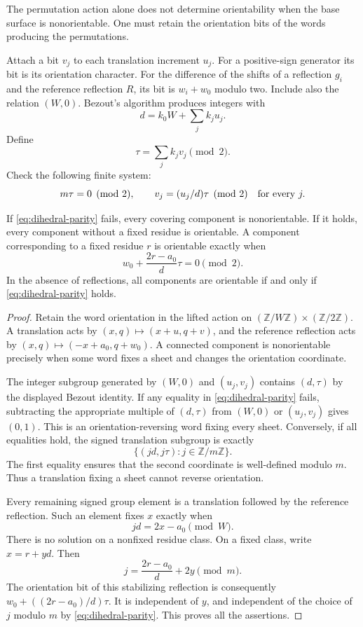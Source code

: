 The permutation action alone does not determine orientability when the
base surface is nonorientable.  One must retain the orientation bits of
the words producing the permutations.

Attach a bit $v_j$ to each translation increment $u_j$.  For a
positive-sign generator its bit is its orientation character.  For the
difference of the shifts of a reflection $g_i$ and the reference
reflection $R$, its bit is $w_i+w_0$ modulo two.  Include also the
relation $(W,0)$.  Bezout's algorithm produces integers with
\[
 d=k_0W+\sum_j k_ju_j.
\]
Define
\[
 \tau=\sum_j k_jv_j\pmod2.
\]
Check the following finite system:
\begin{equation}
 m\tau=0\pmod2,
 \qquad
 v_j=(u_j/d)\tau\pmod2\quad\hbox{for every }j.
 \label{eq:dihedral-parity}
\end{equation}

\begin{lemma}
\label{lem:dihedral-orientation}
If \eqref{eq:dihedral-parity} fails, every covering component is
nonorientable.  If it holds, every component without a fixed residue is
orientable.  A component corresponding to a fixed residue $r$ is
orientable exactly when
\begin{equation}
 w_0+\frac{2r-a_0}{d}\tau=0\pmod2.
 \label{eq:dihedral-exception-orientation}
\end{equation}
In the absence of reflections, all components are orientable if and
only if \eqref{eq:dihedral-parity} holds.
\end{lemma}

\begin{proof}
Retain the word orientation in the lifted action on
$(\mathbb Z/W\mathbb Z)\times(\mathbb Z/2\mathbb Z)$.  A translation
acts by $(x,q)\mapsto(x+u,q+v)$, and the reference reflection acts by
$(x,q)\mapsto(-x+a_0,q+w_0)$.  A connected component is nonorientable
precisely when some word fixes a sheet and changes the orientation
coordinate.

The integer subgroup generated by $(W,0)$ and $(u_j,v_j)$ contains
$(d,\tau)$ by the displayed Bezout identity.  If any equality in
\eqref{eq:dihedral-parity} fails, subtracting the appropriate multiple
of $(d,\tau)$ from $(W,0)$ or $(u_j,v_j)$ gives $(0,1)$.
This is an orientation-reversing word fixing every sheet.  Conversely,
if all equalities hold, the signed translation subgroup is exactly
\[
 \{(jd,j\tau):j\in\mathbb Z/m\mathbb Z\}.
\]
The first equality ensures that the second coordinate is well-defined
modulo $m$.  Thus a translation fixing a sheet cannot reverse
orientation.

Every remaining signed group element is a translation followed by the
reference reflection.  Such an element fixes $x$ exactly when
\[
 jd=2x-a_0\pmod W.
\]
There is no solution on a nonfixed residue class.  On a fixed class,
write $x=r+yd$.  Then
\[
 j=\frac{2r-a_0}{d}+2y\pmod m.
\]
The orientation bit of this stabilizing reflection is consequently
$w_0+((2r-a_0)/d)\tau$.  It is independent of $y$, and independent of
the choice of $j$ modulo $m$ by \eqref{eq:dihedral-parity}.  This proves
all the assertions.
\end{proof}


